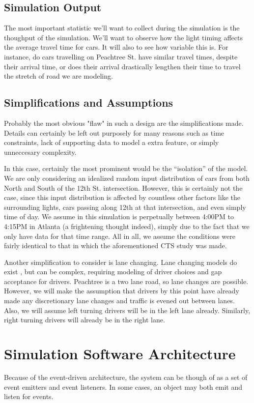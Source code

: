 \documentclass[a4paper,12pt]{article}
\begin{document}
\subsection{Simulation Output}
The most important statistic we'll want to collect during the simulation is the thoughput of the simulation. We'll
want to observe how the light timing affects the average travel time for cars. It will also to see how variable this
is. For instance, do cars travelling on Peachtree St. have similar travel times, despite their arrival time, or does
their arrival drastically lengthen their time to travel the stretch of road we are modeling. 

\subsection{Simplifications and Assumptions}
Probably the most obvious "flaw" in such a design are the simplifications made. Details can certainly be left out
purposely for many reasons such as time constraints, lack of supporting data to model a extra feature, or simply
unneccesary complexity.

In this case, certainly the most prominent would be the ``isolation'' of the model. We are only considering an
idealized random input distribution of cars from both North and South of the 12th St. intersection. However, this is
certainly not the case, since this input distribution is affected by countless other factors like the surrounding
lights, cars passing along 12th at that intersection, and even simply time of day. We assume in this simulation is
perpetually between 4:00PM to 4:15PM in Atlanta (a frightening thought indeed), simply due to the fact that we only
have data for that time range. All in all, we assume the conditions were fairly identical to that in which the 
aforementioned CTS study was made.

Another simplification to consider is lane changing. Lane changing models do exist \cite{lanechanging} \cite{lanechanging2},
but can be complex, requiring modeling of driver choices and gap acceptance for drivers. Peachtree is a two lane road,
so lane changes are possible. However, we will make the assumption that drivers by this point have already made any
discretionary lane changes and traffic is evened out between lanes. Also, we will assume left turning drivers will be
in the left lane already. Similarly, right turning drivers will already be in the right lane.

\section{Simulation Software Architecture}
Because of the event-driven architecture, the system can be though of as a set of event emitters and event listeners.
In some cases, an object may both emit and listen for events.
\end{document}
